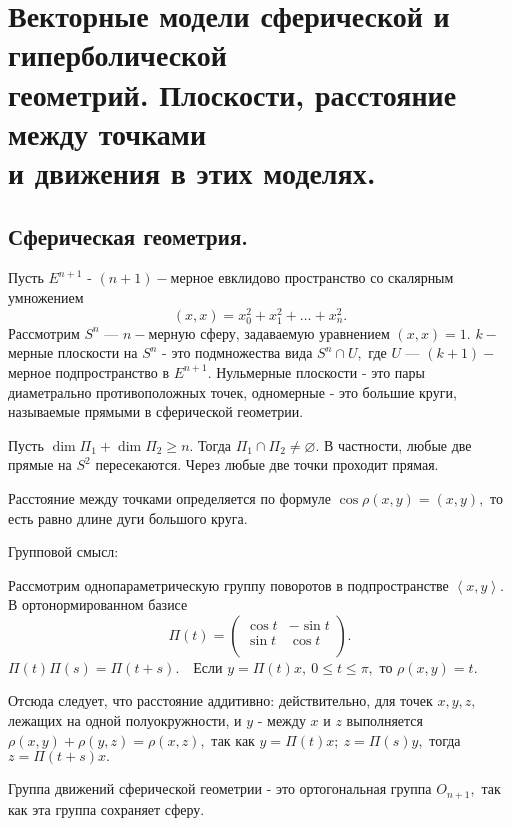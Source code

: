 \documentclass[draft]{article}%
\renewcommand{\c}{\mathbb{C}}
\newcommand{\eps}{\varepsilon}
\newcommand{\pr}{{\rm pr\,}}%
\newcommand{\rk}{{\rm rk\,}}%
\newcommand{\de}{\par\noindent\underline{Def}.\ }%
\newcommand{\ab}{\par\noindent}%
\newcommand{\te}{\par\noindent{\bf Теорема.}\ }%
\newcommand{\dok}{\par\noindent{\textsl{Доказательство}.}\ }%
\newcommand{\qed}{\quad${{\bf Q.E.D.}}$}
\renewcommand{\phi}{\varphi}
\newcommand{\sled}{\par\noindent{\bf Следствие.}\ }%
\newcommand{\baz}[1]{\left(#1_1,\dots,#1_n\right)}%
\newcommand{\lr}{\Leftrightarrow}%
\newcommand{\nn}[1]{#1_1,#1_2,\dots,#1_n}%
\newcommand{\lob}[1]{\left\langle#1\right\rangle}%
\newcommand{\ps}{\oplus}
\newcommand{\rom}[1]{{\rm#1\,}}
\newcommand{\op}[1]{$\mathcal{#1}$}
\newcommand{\om}[1]{\mathcal{#1}}
\newcommand{\oi}[1]{\overrightarrow{#1}}%
\renewcommand{\le}{\leqslant}
\renewcommand{\ge}{\geqslant}
\newcommand{\we}[1]{\widehat{#1}}
\begin{document}
%

\section{Векторные модели сферической и гиперболической\\ геометрий. Плоскости, расстояние между точками\\ и движения в этих моделях.}
\label{q56}
\subsection{Сферическая геометрия.}
Пусть $E^{n+1}$ - $(n+1)-$мерное евклидово пространство со скалярным умножением $$(x,x)=x_0^2+x_1^2+\dots+x_n^2.$$
Рассмотрим $S^n$ --- $n-$мерную сферу, задаваемую уравнением $(x,x)=1.$ $k-$мерные плоскости на $S^n$ - это
подмножества вида $S^n\cap U,$ где $U$ --- $(k+1)-$мерное подпространство в $E^{n+1}.$ Нульмерные плоскости - это
пары диаметрально противоположных точек, одномерные - это большие круги, называемые прямыми в сферической геометрии.
\ab Пусть $\dim \Pi_1+\dim\Pi_2\ge n.$ Тогда $\Pi_1\cap\Pi_2\ne \varnothing.$ В частности, любые две прямые на $S^2$ пересекаются.
Через любые две точки проходит прямая.
\ab Расстояние между точками определяется по формуле $\cos\rho(x,y)=(x,y),$ то есть равно длине дуги большого круга.
\ab Групповой смысл:
\ab Рассмотрим однопараметрическую группу поворотов в подпространстве $\lob{x,y}.$ В ортонормированном базисе
$$
\Pi(t)=\left(%
\begin{array}{cc}
  \cos t & -\sin t \\
  \sin t & \cos t \\
\end{array}%
\right).
$$
$\Pi(t)\Pi(s)=\Pi(t+s).$\ \ Если $y=\Pi(t)x,\ 0\le t\le\pi,$ то $\rho(x,y)=t.$
\ab Отсюда следует, что расстояние аддитивно: действительно, для точек $x,y,z,$ лежащих на одной полуокружности,
и $y$ - между $x$ и $z$ выполняется $\rho(x,y)+\rho(y,z)=\rho(x,z),$ так как $y=\Pi(t)x;\ z=\Pi(s)y,$ тогда
$z=\Pi(t+s)x.$
\ab Группа движений сферической геометрии - это ортогональная группа $O_{n+1},$ так как эта группа сохраняет сферу.
\end{document}
